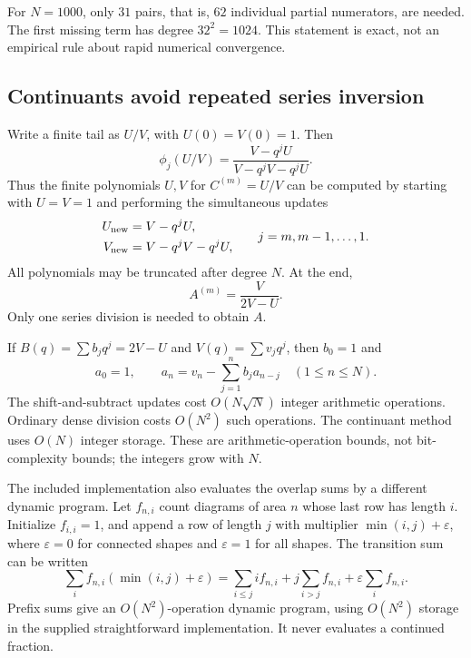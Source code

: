 \documentclass[11pt,letterpaper]{article}
\numberwithin{equation}{section}
\theoremstyle{definition}
\begin{document}
For $N=1000$, only $31$ pairs, that is, $62$ individual partial numerators,
are needed. The first missing term has degree $32^2=1024$. This statement
is exact, not an empirical rule about rapid numerical convergence.

\subsection{Continuants avoid repeated series inversion}
Write a finite tail as $U/V$, with $U(0)=V(0)=1$. Then
\[
 \phi_j(U/V)=\frac{V-q^jU}{V-q^jV-q^jU}.
\]
Thus the finite polynomials $U,V$ for $C^{(m)}=U/V$ can be computed by
starting with $U=V=1$ and performing the simultaneous updates
\begin{equation}
 \begin{split}
 U_{\rm new}&=V-q^jU,\\
 V_{\rm new}&=V-q^jV-q^jU,
 \end{split}
 \qquad j=m,m-1,\ldots,1.
 \label{eq:continuants}
\end{equation}
All polynomials may be truncated after degree $N$. At the end,
\begin{equation}
 A^{(m)}=\frac{V}{2V-U}.
 \label{eq:continuantA}
\end{equation}
Only one series division is needed to obtain $A$.

If $B(q)=\sum b_jq^j=2V-U$ and $V(q)=\sum v_jq^j$, then $b_0=1$ and
\begin{equation}
 a_0=1,\qquad
 a_n=v_n-\sum_{j=1}^{n}b_ja_{n-j}\quad(1\le n\le N).
 \label{eq:divisionrecurrence}
\end{equation}
The shift-and-subtract updates cost $O(N\sqrt N)$ integer arithmetic
operations. Ordinary dense division costs $O(N^2)$ such operations. The
continuant method uses $O(N)$ integer storage. These are arithmetic-operation
bounds, not bit-complexity bounds; the integers grow with $N$.

The included implementation also evaluates the overlap sums by a different
dynamic program. Let $f_{n,i}$ count diagrams of area $n$ whose last row has
length $i$. Initialize $f_{i,i}=1$, and append a row of length $j$ with
multiplier $\min(i,j)+\varepsilon$, where $\varepsilon=0$ for connected
shapes and $\varepsilon=1$ for all shapes. The transition sum can be written
\begin{equation}
 \sum_i f_{n,i}(\min(i,j)+\varepsilon)
 =\sum_{i\le j}i f_{n,i}
  +j\sum_{i>j}f_{n,i}
  +\varepsilon\sum_i f_{n,i}.
 \label{eq:prefixDP}
\end{equation}
Prefix sums give an $O(N^2)$-operation dynamic program, using $O(N^2)$
storage in the supplied straightforward implementation. It never evaluates
a continued fraction.
\end{document}
